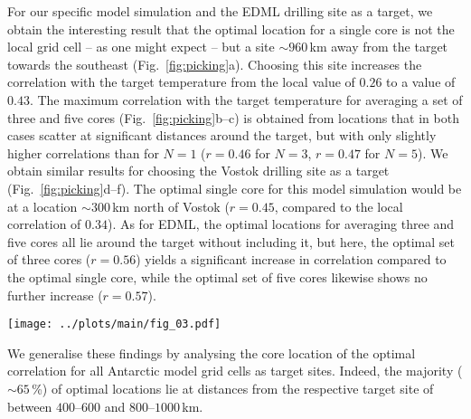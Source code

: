 \documentclass[cp, manuscript]{copernicus}
\begin{document}
For our specific model simulation and the EDML drilling site as a target, we
obtain the interesting result that the optimal location for a single core is not
the local grid cell -- as one might expect -- but a site $\sim960$\,km away from
the target towards the southeast (Fig.~\ref{fig:picking}a). Choosing this site
increases the correlation with the target temperature from the local value of
$0.26$ to a value of $0.43$. The maximum correlation with the target temperature
for averaging a set of three and five cores (Fig.~\ref{fig:picking}b--c) is
obtained from locations that in both cases scatter at significant distances
around the target, but with only slightly higher correlations than for $N=1$
($r=0.46$ for $N=3$, $r=0.47$ for $N=5$). We obtain similar results for
choosing the Vostok drilling site as a target (Fig.~\ref{fig:picking}d--f). The
optimal single core for this model simulation would be at a location
$\sim300$\,km north of Vostok ($r=0.45$, compared to the local correlation of
$0.34$). As for EDML, the optimal locations for averaging three and five cores
all lie around the target without including it, but here, the optimal set of
three cores ($r=0.56$) yields a significant increase in correlation compared to
the optimal single core, while the optimal set of five cores likewise shows no
further increase ($r=0.57$).

\begin{figure*}[t]%
\centering
\texttt{[image: ../plots/main/fig\_03.pdf]}
\caption[Picking optimal sites]{%
  Picking ice core locations that optimally reconstruct interannual temperatures
  at the EDML and Vostok drilling sites. The maps show the correlation in the
  model data between the annual temperature time series at the target sites
  (black crosses) EDML (\textbf{a}--\textbf{c}) and Vostok
  (\textbf{d}--\textbf{f}) with the fields of precipitation-weighted oxygen
  isotope composition. Filled black circles denote those grid cells that
  maximise the correlation with the target site temperature for choosing either
  a single grid cell ($N=1$; \textbf{a}, \textbf{d}) or for averaging across
  $N=3$ (\textbf{b}, \textbf{e}) or $N=5$ (\textbf{c}, \textbf{f}) grid cells.}
\label{fig:picking}%
\end{figure*}%

We generalise these findings by analysing the core location of the optimal
correlation for all Antarctic model grid cells as target sites. Indeed, the
majority ($\sim65$\,\%) of optimal locations lie at distances from the
respective target site of between $400$--$600$ and $800$--$1000$\,km.
\end{document}
